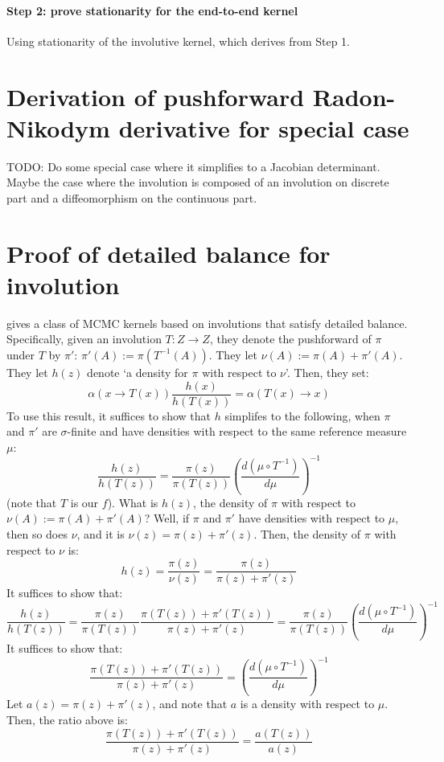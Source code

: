 \documentclass[twoside]{article}
\begin{document}
\paragraph{Step 2: prove stationarity for the end-to-end kernel}
Using stationarity of the involutive kernel, which derives from Step 1.

\section{Derivation of pushforward Radon-Nikodym derivative for special case}
TODO: Do some special case where it simplifies to a Jacobian determinant.
Maybe the case where the involution is composed of an involution on discrete part and a diffeomorphism on the continuous part.

\section{Proof of detailed balance for involution}
\citet{tierney1998note} gives a class of MCMC kernels based on involutions that satisfy detailed balance.
Specifically, given an involution $T : Z \to Z$, they denote the pushforward of $\pi$ under $T$ by $\pi'$:
$\pi'(A) := \pi(T^{-1}(A))$.
They let $\nu(A) := \pi(A) + \pi'(A)$.
They let $h(z)$ denote `a density for $\pi$ with respect to $\nu$'.
Then, they set:
\[
\alpha(x \to T(x)) \frac{h(x)}{h(T(x))} = \alpha(T(x) \to x)
\]
To use this result, it suffices to show that $h$ simplifes to the following, when $\pi$ and $\pi'$ are $\sigma$-finite and have densities with respect to the same reference measure $\mu$:
\[
\frac{h(z)}{h(T(z))}= \frac{\pi(z)}{\pi(T(z))} \left( \frac{d (\mu \circ T^{-1})}{d \mu} \right)^{-1}
\]
(note that $T$ is our $f$).
What is $h(z)$, the density of $\pi$ with respect to $\nu(A) := \pi(A) + \pi'(A)$?
Well, if $\pi$ and $\pi'$ have densities with respect to $\mu$, then so does $\nu$, and it is $\nu(z) = \pi(z) + \pi'(z)$.
Then, the density of $\pi$ with respect to $\nu$ is:
\[
h(z) = \frac{\pi(z)}{\nu(z)} = \frac{\pi(z)}{\pi(z) + \pi'(z)}
\]
It suffices to show that:
\[
\frac{h(z)}{h(T(z))} = \frac{\pi(z)}{\pi(T(z))} \frac{\pi(T(z)) + \pi'(T(z))}{\pi(z) + \pi'(z)}
= \frac{\pi(z)}{\pi(T(z))} \left( \frac{d (\mu \circ T^{-1})}{d \mu} \right)^{-1}
\]
It suffices to show that:
\[
\frac{\pi(T(z)) + \pi'(T(z))}{\pi(z) + \pi'(z)} = \left( \frac{d (\mu \circ T^{-1})}{d \mu} \right)^{-1}
\]
Let $a(z) = \pi(z) + \pi'(z)$, and note that $a$ is a density with respect to $\mu$.
Then, the ratio above is:
\[
\frac{\pi(T(z)) + \pi'(T(z))}{\pi(z) + \pi'(z)} = \frac{a(T(z))}{a(z)}
\]
\end{document}

